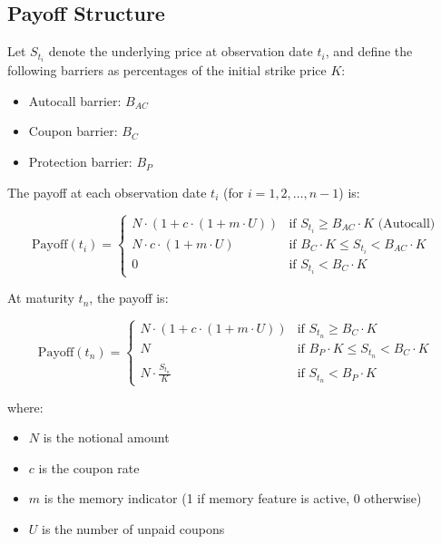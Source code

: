 \documentclass[12pt,a4paper]{article}
\begin{document}
\subsection{Payoff Structure}

Let $S_{t_i}$ denote the underlying price at observation date $t_i$, and define the following barriers as percentages of the initial strike price $K$:

\begin{itemize}
    \item Autocall barrier: $B_{AC}$
    \item Coupon barrier: $B_C$
    \item Protection barrier: $B_P$
\end{itemize}

The payoff at each observation date $t_i$ (for $i = 1, 2, \ldots, n-1$) is:

\begin{equation}
\text{Payoff}(t_i) = \begin{cases}
N \cdot (1 + c \cdot (1 + m \cdot U)) & \text{if } S_{t_i} \geq B_{AC} \cdot K \text{ (Autocall)}\\
N \cdot c \cdot (1 + m \cdot U) & \text{if } B_C \cdot K \leq S_{t_i} < B_{AC} \cdot K\\
0 & \text{if } S_{t_i} < B_C \cdot K
\end{cases}
\end{equation}

At maturity $t_n$, the payoff is:

\begin{equation}
\text{Payoff}(t_n) = \begin{cases}
N \cdot (1 + c \cdot (1 + m \cdot U)) & \text{if } S_{t_n} \geq B_C \cdot K\\
N & \text{if } B_P \cdot K \leq S_{t_n} < B_C \cdot K\\
N \cdot \frac{S_{t_n}}{K} & \text{if } S_{t_n} < B_P \cdot K
\end{cases}
\end{equation}

where:
\begin{itemize}
    \item $N$ is the notional amount
    \item $c$ is the coupon rate
    \item $m$ is the memory indicator (1 if memory feature is active, 0 otherwise)
    \item $U$ is the number of unpaid coupons
\end{itemize}
\end{document}
